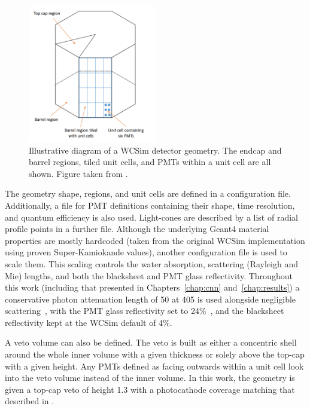 \begin{figure} %
    \includegraphics[width=0.5\textwidth]{diagrams/4-chips/sim_geom.pdf}
    \caption[Illustrative diagram of a WCSim detector geometry]
    {Illustrative diagram of a WCSim detector geometry. The endcap and barrel regions, tiled unit
        cells, and PMTs within a unit cell are all shown. Figure taken from
        .}
    \label{fig:sim_geom}
\end{figure}

The geometry shape, regions, and unit cells are defined in a configuration file. Additionally, a
file for PMT definitions containing their shape, time resolution, and quantum efficiency is also
used. Light-cones are described by a list of radial profile points in a further file. Although the
underlying Geant4 material properties are mostly hardcoded (taken from the original WCSim
implementation using proven Super-Kamiokande values), another configuration file is used to scale
them. This scaling controls the water absorption, scattering (Rayleigh and Mie) lengths, and both
the blacksheet and PMT glass reflectivity. Throughout this work (including that presented in
Chapters~\ref{chap:cnn} and~\ref{chap:results}) a conservative photon attenuation length of
\SI{50}{} at \SI{405}{} is used alongside negligible
scattering~\cite{campbell2020}, with the PMT glass reflectivity set to
24\%~\cite{hamamatsu_handbook}, and the blacksheet reflectivity kept at the WCSim default of 4\%.

A veto volume can also be defined. The veto is built as either a concentric shell around the whole
inner volume with a given thickness or solely above the top-cap with a given height. Any PMTs
defined as facing outwards within a unit cell look into the veto volume instead of the inner
volume. In this work, the \chipsfive geometry is given a top-cap veto of height \SI{1.3}{}
with a photocathode coverage matching that described in
.


